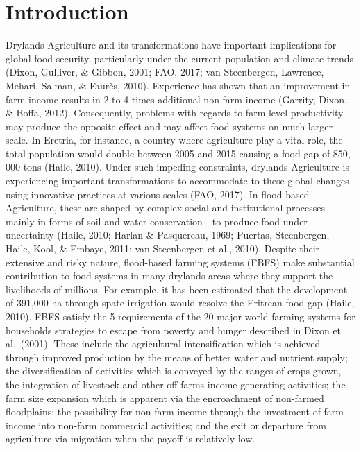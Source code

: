\documentclass[]{elsarticle} %
\begin{document}
\hypertarget{I}{%
\section{Introduction}\label{I}}

Drylands Agriculture and its transformations have important implications for global food security, particularly under the current population and climate trends (Dixon, Gulliver, \& Gibbon, 2001; FAO, 2017; van Steenbergen, Lawrence, Mehari, Salman, \& Faurès, 2010). Experience has shown that an improvement in farm income results in 2 to 4 times additional non-farm income (Garrity, Dixon, \& Boffa, 2012). Consequently, problems with regards to farm level productivity may produce the opposite effect and may affect food systems on much larger scale. In Eretria, for instance, a country where agriculture play a vital role, the total population would double between 2005 and 2015 causing a food gap of 850, 000 tons (Haile, 2010). Under such impeding constraints, drylands Agriculture is experiencing important transformations to accommodate to these global changes using innovative practices at various scales (FAO, 2017). In flood-based Agriculture, these are shaped by complex social and institutional processes - mainly in forms of soil and water conservation - to produce food under uncertainty (Haile, 2010; Harlan \& Pasquereau, 1969; Puertas, Steenbergen, Haile, Kool, \& Embaye, 2011; van Steenbergen et al., 2010). Despite their extensive and risky nature, flood-based farming systems (FBFS) make substantial contribution to food systems in many drylands areas where they support the livelihoods of millions. For example, it has been estimated that the development of 391,000 ha through spate irrigation would resolve the Eritrean food gap (Haile, 2010). FBFS satisfy the 5 requirements of the 20 major world farming systems for households strategies to escape from poverty and hunger described in Dixon et al.~(2001). These include the agricultural intensification which is achieved through improved production by the means of better water and nutrient supply; the diversification of activities which is conveyed by the ranges of crops grown, the integration of livestock and other off-farms income generating activities; the farm size expansion which is apparent via the encroachment of non-farmed floodplains; the possibility for non-farm income through the investment of farm income into non-farm commercial activities; and the exit or departure from agriculture via migration when the payoff is relatively low.
\end{document}
